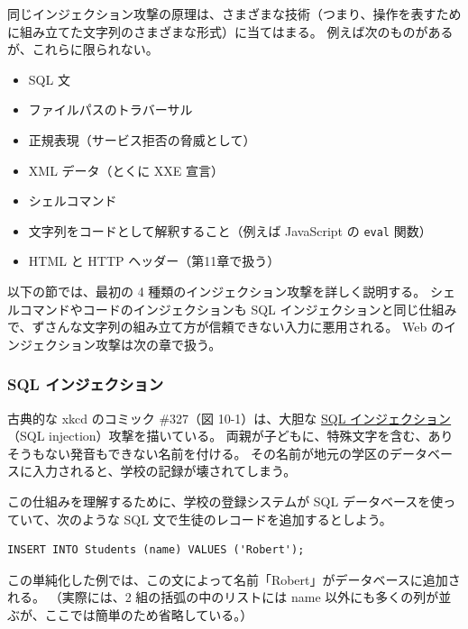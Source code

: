 \documentclass[uplatex]{jsarticle}
\def\label#1{}%
\begin{document}
同じインジェクション攻撃の原理は、さまざまな技術（つまり、操作を表すために組み立てた文字列のさまざまな形式）に当てはまる。
例えば次のものがあるが、これらに限られない。
\begin{itemize}
\item SQL 文
\item ファイルパスのトラバーサル
\item 正規表現（サービス拒否の脅威として）
\item XML データ（とくに XXE 宣言）
\item シェルコマンド
\item 文字列をコードとして解釈すること（例えば JavaScript の \texttt{eval} 関数）
\item HTML と HTTP ヘッダー（第11章で扱う）
\end{itemize}

以下の節では、最初の 4 種類のインジェクション攻撃を詳しく説明する。
シェルコマンドやコードのインジェクションも SQL インジェクションと同じ仕組みで、ずさんな文字列の組み立て方が信頼できない入力に悪用される。
Web のインジェクション攻撃は次の章で扱う。

\subsubsection{SQL インジェクション}

\begin{exa}\label{exa:ch10-bobby-tables}
古典的な xkcd のコミック \#327（図 10-1）は、大胆な \underline{SQL インジェクション}（SQL injection）攻撃を描いている。
両親が子どもに、特殊文字を含む、ありそうもない発音もできない名前を付ける。
その名前が地元の学区のデータベースに入力されると、学校の記録が壊されてしまう。
\end{exa}

この仕組みを理解するために、学校の登録システムが SQL データベースを使っていて、次のような SQL 文で生徒のレコードを追加するとしよう。
\begin{verbatim}
INSERT INTO Students (name) VALUES ('Robert');
\end{verbatim}
この単純化した例では、この文によって名前「Robert」がデータベースに追加される。
（実際には、2 組の括弧の中のリストには name 以外にも多くの列が並ぶが、ここでは簡単のため省略している。）
\end{document}
